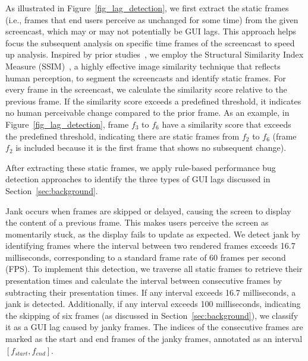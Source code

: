 As illustrated in Figure~\ref{fig_lag_detection}, we first extract the static frames (i.e., frames that end users perceive as unchanged for some time) from the given screencast, which may or may not potentially be GUI lags. This approach helps focus the subsequent analysis on specific time frames of the screencast to speed up analysis. 
Inspired by prior studies~\cite{2023_UIST_Video2Action, 2023_ICSE_Efficiency_Matters_Speeding_Up_Automated_Testing_with_GUI_Rendering_Inference}, we employ the Structural Similarity Index Measure (SSIM)~\cite{2004_SSIM_Transactions_on_Image_Processing}, a highly effective image similarity technique that reflects human perception, to segment the screencasts and identify static frames. For every frame in the screencast, we calculate the similarity score relative to the previous frame. If the similarity score exceeds a predefined threshold, it indicates no human perceivable change compared to the prior frame. 
As an example, in Figure~\ref{fig_lag_detection}, frame $f_{3}$ to $f_{6}$ have a similarity score that exceeds the predefined threshold, indicating there are static frames from $f_{2}$ to $f_{6}$ (frame $f_{2}$ is included because it is the first frame that shows no subsequent change).

After extracting these static frames, we apply rule-based performance bug detection approaches to identify the three types of GUI lags discussed in Section~\ref{sec:background}. 

 Jank occurs when frames are skipped or delayed, causing the screen to display the content of a previous frame. This makes users perceive the screen as momentarily stuck, as the display fails to update as expected. %
We detect jank by identifying frames where the interval between two rendered frames exceeds 16.7 milliseconds, corresponding to a standard frame rate of 60 frames per second (FPS). To implement this detection, we traverse all static frames to retrieve their presentation times and calculate the interval between consecutive frames by subtracting their presentation times. If any interval exceeds 16.7 milliseconds, a jank is detected. Additionally, if any interval exceeds 100 milliseconds, indicating the skipping of six frames (as discussed in Section~\ref{sec:background}), we classify it as a GUI lag caused by janky frames. The indices of the consecutive frames are marked as the start and end frames of the janky frames, annotated as an interval $[f_{start}, f_{end}]$. 


